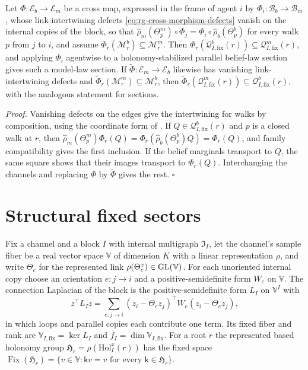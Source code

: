 Let $\Phi:\mathcal E_b\to\mathcal E_m$ be a cross map, expressed in the frame of agent $i$ by
$\Phi_i:\mathcal B_b\to\mathcal B_m$, whose link-intertwining defects \eqref{eq:rg-cross-morphism-defects}
vanish on the internal copies of the block, so that
$\widehat\rho_m(\Theta^m_p)\circ\Phi_j=\Phi_i\circ\widehat\rho_b(\Theta^b_p)$ for every walk $p$ from $j$ to
$i$, and assume $\Phi_r(\mathscr M^b_r)\subseteq\mathscr M^m_r$. Then
$\Phi_r(\mathscr Q^b_{I,\mathrm{fix}}(r))\subseteq\mathscr Q^m_{I,\mathrm{fix}}(r)$, and applying $\Phi_i$
agentwise to a holonomy-stabilized parallel belief-law section gives such a model-law section. If
$\widetilde\Phi:\mathcal E_m\to\mathcal E_b$ likewise has vanishing link-intertwining defects and
$\widetilde\Phi_r(\mathscr M^m_r)\subseteq\mathscr M^b_r$, then
$\widetilde\Phi_r(\mathscr Q^m_{I,\mathrm{fix}}(r))\subseteq\mathscr Q^b_{I,\mathrm{fix}}(r)$, with the
analogous statement for sections. 

\noindent\emph{Proof.}
Vanishing defects on the edges give the intertwining for walks by composition, using the coordinate form of
. If $Q\in\mathscr Q^b_{I,\mathrm{fix}}(r)$ and $p$ is a closed walk at
$r$, then $\widehat\rho_m(\Theta^m_p)\Phi_r(Q)=\Phi_r(\widehat\rho_b(\Theta^b_p)Q)=\Phi_r(Q)$, and family
compatibility gives the first inclusion. If the belief marginals transport to $Q$, the same square shows
that their images transport to $\Phi_r(Q)$. Interchanging the channels and replacing $\Phi$ by
$\widetilde\Phi$ gives the rest. $\square$

\section{Structural fixed sectors}
\label{sec:cg-partial}

Fix a channel and a block $I$ with internal multigraph $\mathfrak I_I$, let the channel's sample fiber be
a real vector space $\mathbb V$ of dimension $K$ with a linear representation $\rho$, and write $\Theta_e$ for the
represented link $\rho(\Theta^x_e)\in\mathrm{GL}(\mathbb V)$. For each unoriented internal copy choose an orientation
$e:j\to i$ and a positive-semidefinite form $W_e$ on $\mathbb V$. The connection Laplacian of the block is the
positive-semidefinite form $L_I$ on $\mathbb V^I$ with
\begin{equation}
z^\top L_Iz=\sum_{e:j\to i}(z_i-\Theta_ez_j)^\top W_e(z_i-\Theta_ez_j),
\label{eq:cg-connection-laplacian-energy}
\end{equation}
in which loops and parallel copies each contribute one term. Its fixed fiber and rank are
$\mathbb V_{I,\mathrm{fix}}=\ker L_I$ and $f_I=\dim\mathbb V_{I,\mathrm{fix}}$. For a root $r$ the represented based holonomy group
$\mathfrak H_r=\rho(\mathrm{Hol}^x_I(r))$ has the fixed space
$\operatorname{Fix}(\mathfrak H_r)=\{v\in \mathbb V:\mathsf kv=v\text{ for every }\mathsf k\in\mathfrak H_r\}$.

